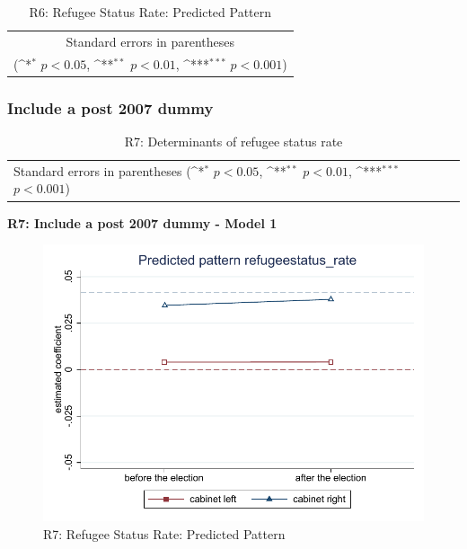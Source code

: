 \documentclass[10pt,a4paper]{scrartcl}
\begin{document}
\begin{table}[!ht]\centering
	\footnotesize
	\renewcommand{\arraystretch}{1.2}
	\def\sym#1{\ifmmode^{#1}\else\(^{#1}\)\fi}
	\caption{R6: Refugee Status Rate: Predicted Pattern}
	\begin{tabular}{l*{2}{c}}
		\hline\hline
		
		\hline\hline
		\multicolumn{3}{c}{\footnotesize Standard errors in parentheses} \\
		\multicolumn{3}{c}{\footnotesize (\sym{*} \(p<0.05\), \sym{**} \(p<0.01\), \sym{***} \(p<0.001\))} \\
	\end{tabular}
\end{table}




\clearpage
\FloatBarrier
\subsubsection{Include a post 2007 dummy}
\begin{table}[!ht]\centering
	\renewcommand{\arraystretch}{1.25}
	\small
	\def\sym#1{\ifmmode^{#1}\else\(^{#1}\)\fi}
	\caption{R7: Determinants of refugee status rate}
	\begin{tabular}{l*{2}{c}}
		\hline\hline
		
		\hline\hline
		\multicolumn{3}{l}{\footnotesize Standard errors in parentheses (\sym{*} \(p<0.05\), \sym{**} \(p<0.01\), \sym{***} \(p<0.001\))}\\
	\end{tabular}
\end{table}

\clearpage
\textbf{R7: Include a post 2007 dummy - Model 1}
\begin{figure}[!ht]
	\centering
	\includegraphics[width=1\textwidth]{figures_edited/refugeestatus_rate_graph1_R7.pdf}
	\caption{R7: Refugee Status Rate: Predicted Pattern}
\end{figure}
\end{document}
